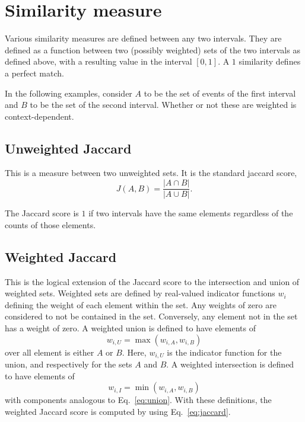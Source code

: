 \documentclass{article}
\begin{document}
\section{Similarity measure}
\label{sec:meth-similarity}

Various similarity measures are defined between any two intervals.
They are defined as a function between two (possibly weighted) sets of
the two intervals as defined above, with a resulting value in the
interval $[0,1]$.  A $1$ similarity defines a perfect match.

In the following examples, consider $A$ to be the set of events of the
first interval and $B$ to be the set of the second interval.  Whether
or not these are weighted is context-dependent.

\subsection{Unweighted Jaccard}
This is a measure between two unweighted sets.  It is the standard
jaccard score,
\begin{equation}
  \label{eq:jaccard}
  J(A,B) = \frac{|A \cap B|}{|A \cup B|}.
\end{equation}

The Jaccard score is $1$ if two intervals have the same elements
regardless of the counts of those elements.

\subsection{Weighted Jaccard}
This is the logical extension of the Jaccard score to the intersection
and union of weighted sets.  Weighted sets are defined by real-valued
indicator functions $w_{i}$ defining the weight of each element within
the set.  Any weights of zero are considered to not be contained in
the set.  Conversely, any element not in the set has a weight of zero.
A weighted union is defined to have elements of
\begin{equation}
  \label{eq:union}
  w_{i,U} = \max(w_{i,A}, w_{i,B})
\end{equation}
over all element is either $A$ or $B$.  Here, $w_{i,U}$ is the
indicator function for the union, and respectively for the sets $A$
and $B$.  A weighted intersection is defined to have elements of
\begin{equation}
  w_{i,I} = \min(w_{i,A}, w_{i,B})
\end{equation}
with components analogous to Eq.~\ref{eq:union}.  With these
definitions, the weighted Jaccard score is computed by using
Eq.~\ref{eq:jaccard}.
\end{document}
